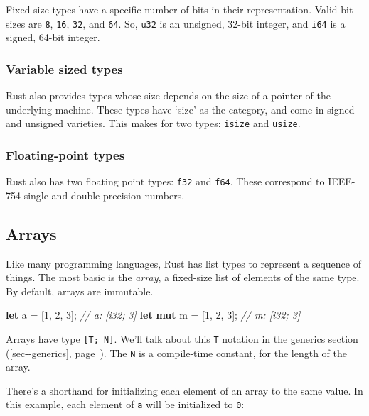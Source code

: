 \documentclass[a4paper,]{book}
\renewcommand*{\hyperref}[2][\ar]{%
  \def\ar{#2}%
  #2 (\autoref{#1}, page~\pageref{#1})}
\newenvironment{Shaded}{\begin{snugshade}}{\end{snugshade}}
\newcommand{\KeywordTok}[1]{\textcolor[rgb]{0.13,0.29,0.53}{\textbf{{#1}}}}
\newcommand{\DecValTok}[1]{\textcolor[rgb]{0.00,0.00,0.81}{{#1}}}
\newcommand{\CommentTok}[1]{\textcolor[rgb]{0.56,0.35,0.01}{\textit{{#1}}}}
\newcommand{\NormalTok}[1]{{#1}}
\begin{document}
Fixed size types have a specific number of bits in their representation.
Valid bit sizes are \texttt{8}, \texttt{16}, \texttt{32}, and
\texttt{64}. So, \texttt{u32} is an unsigned, 32-bit integer, and
\texttt{i64} is a signed, 64-bit integer.

\subsubsection{Variable sized types}\label{variable-sized-types}

Rust also provides types whose size depends on the size of a pointer of
the underlying machine. These types have `size' as the category, and
come in signed and unsigned varieties. This makes for two types:
\texttt{isize} and \texttt{usize}.

\subsubsection{Floating-point types}\label{floating-point-types}

Rust also has two floating point types: \texttt{f32} and \texttt{f64}.
These correspond to IEEE-754 single and double precision numbers.

\subsection{Arrays}\label{arrays}

Like many programming languages, Rust has list types to represent a
sequence of things. The most basic is the \emph{array}, a fixed-size
list of elements of the same type. By default, arrays are immutable.

\begin{Shaded}
\begin{Highlighting}[]
\KeywordTok{let} \NormalTok{a = [}\DecValTok{1}\NormalTok{, }\DecValTok{2}\NormalTok{, }\DecValTok{3}\NormalTok{]; }\CommentTok{// a: [i32; 3]}
\KeywordTok{let} \KeywordTok{mut} \NormalTok{m = [}\DecValTok{1}\NormalTok{, }\DecValTok{2}\NormalTok{, }\DecValTok{3}\NormalTok{]; }\CommentTok{// m: [i32; 3]}
\end{Highlighting}
\end{Shaded}

Arrays have type \texttt{{[}T;\ N{]}}. We'll talk about this \texttt{T}
notation \hyperref[sec--generics]{in the generics section}. The
\texttt{N} is a compile-time constant, for the length of the array.

There's a shorthand for initializing each element of an array to the
same value. In this example, each element of \texttt{a} will be
initialized to \texttt{0}:
\end{document}
